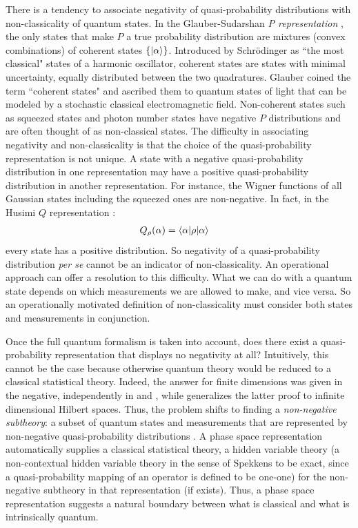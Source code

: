 There is a tendency to associate negativity of quasi-probability distributions with non-classicality of quantum states. In the Glauber-Sudarshan \emph{P representation} \cite{glauber_coherent_1963, sudarshan_equivalence_1963}, the only states that make $P$ a true probability distribution are mixtures (convex combinations) of coherent states $\{{\left\vert{\alpha}\right\rangle}\}$. Introduced by Schr{\"o}dinger as ``the most classical" states of a harmonic oscillator, coherent states are states with minimal uncertainty, equally distributed between the two quadratures. Glauber coined the term ``coherent states" and ascribed them to quantum states of light that can be modeled by a stochastic classical electromagnetic field. Non-coherent states such as squeezed states and photon number states have negative $P$ distributions and are often thought of as non-classical states. %
The difficulty in associating negativity and non-classicality is that the choice of the quasi-probability representation is not unique. A state with a negative quasi-probability distribution in one representation may have a positive quasi-probability distribution in another representation. For instance, the Wigner functions of all Gaussian states including the squeezed ones are non-negative. In fact, in the Husimi $Q$ representation \cite{husimi_formal_1940}:
\begin{align}
	Q_{\rho}(\alpha) &= \braket{\alpha| \rho |\alpha}
\end{align}
every state has a positive distribution. So negativity of a quasi-probability distribution \emph{per se} cannot be an indicator of non-classicality. An operational approach can offer a resolution to this difficulty. What we can do with a quantum state depends on which measurements we are allowed to make, and vice versa. So an operationally motivated definition of non-classicality must consider both states and measurements in conjunction.

Once the full quantum formalism is taken into account, does there exist a quasi-probability representation that displays no negativity at all? Intuitively, this cannot be the case because otherwise quantum theory would be reduced to a classical statistical theory. Indeed, the answer for finite dimensions was given in the negative, independently in \cite{spekkens_negativity_2008} and \cite{ferrie_frame_2008,ferrie_framed_2009}, while \cite{ferrie_necessity_2010} generalizes the latter proof to infinite dimensional Hilbert spaces. Thus, the problem shifts to finding a \emph{non-negative subtheory}: a subset of quantum states and measurements that are represented by non-negative quasi-probability distributions \cite{wallman_non-negative_2012}. A phase space representation automatically supplies a classical statistical theory, a hidden variable theory (a non-contextual hidden variable theory in the sense of Spekkens \cite{spekkens_negativity_2008} to be exact, since a quasi-probability mapping of an operator is defined to be one-one) for the non-negative subtheory in that representation (if exists). Thus, a phase space representation suggests a natural boundary between what is classical and what is intrinsically quantum.

